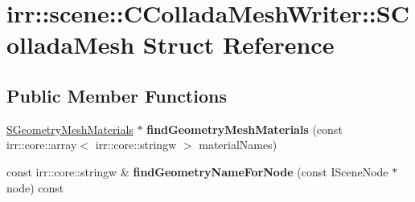 \hypertarget{structirr_1_1scene_1_1_c_collada_mesh_writer_1_1_s_collada_mesh}{\section{irr\-:\-:scene\-:\-:C\-Collada\-Mesh\-Writer\-:\-:S\-Collada\-Mesh Struct Reference}
\label{structirr_1_1scene_1_1_c_collada_mesh_writer_1_1_s_collada_mesh}
}
\subsection*{Public Member Functions}
\begin{DoxyCompactItemize}
\item 
\hypertarget{structirr_1_1scene_1_1_c_collada_mesh_writer_1_1_s_collada_mesh_a650490a1a964f4915ae277870229ae12}{\hyperlink{structirr_1_1scene_1_1_c_collada_mesh_writer_1_1_s_geometry_mesh_materials}{S\-Geometry\-Mesh\-Materials} $\ast$ {\bfseries find\-Geometry\-Mesh\-Materials} (const irr\-::core\-::array$<$ irr\-::core\-::stringw $>$ material\-Names)}\label{structirr_1_1scene_1_1_c_collada_mesh_writer_1_1_s_collada_mesh_a650490a1a964f4915ae277870229ae12}

\item 
\hypertarget{structirr_1_1scene_1_1_c_collada_mesh_writer_1_1_s_collada_mesh_acad9f77d7719c007813b5ef6c2c3f17d}{const irr\-::core\-::stringw \& {\bfseries find\-Geometry\-Name\-For\-Node} (const I\-Scene\-Node $\ast$node) const }\label{structirr_1_1scene_1_1_c_collada_mesh_writer_1_1_s_collada_mesh_acad9f77d7719c007813b5ef6c2c3f17d}

\end{DoxyCompactItemize}
